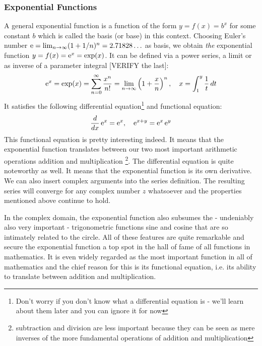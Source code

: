 \subsubsection{Exponential Functions}
A general exponential function is a function of the form $y = f(x) = b^x$ for some constant $b$ which is called the basis (or base) in this context. Choosing Euler's number $\operatorname{\mathrm{e}} = \lim_{n \rightarrow \infty} (1 + 1/n)^n = 2.71828\ldots$ as basis, we obtain \emph{the} exponential function $y = f(x) = \operatorname{\mathrm{e}}^x = \exp(x)$. It can be defined via a power series, a limit or as inverse of a parameter integral [VERIFY the last]:
\begin{equation}
\operatorname{\mathrm{e}}^x 
= \exp(x)
= \sum_{n=0}^{\infty} \frac{x^n}{n!}
= \lim_{n \rightarrow \infty} \left( 1 + \frac{x}{n} \right)^n, \quad
x = \int_1^y \frac{1}{t} \, dt
\end{equation}
It satisfies the following differential equation\footnote{Don't worry if you don't know what a differential equation is - we'll learn about them later and you can ignore it for now} and functional equation:
\begin{equation}
\frac{d}{dx} \operatorname{\mathrm{e}}^x = \operatorname{\mathrm{e}}^x, \quad
\operatorname{\mathrm{e}}^{x+y} = \operatorname{\mathrm{e}}^x \operatorname{\mathrm{e}}^y
\end{equation}
This functional equation is pretty interesting indeed. It means that the exponential function translates between our two most important arithmetic operations addition and multiplication \footnote{subtraction and division are less important because they can be seen as mere inverses of the more fundamental operations of addition and multiplication}. The differential equation is quite noteworthy as well. It means that the exponential function is its own derivative. We can also insert complex arguments into the series definition. The resulting series will converge for any complex number $z$ whatsoever and the properties mentioned above continue to hold.

\medskip
In the complex domain, the exponential function also subsumes the - undeniably also very important - trigonometric functions sine and cosine that are so intimately related to the circle. All of these features are quite remarkable and secure the exponential function a top spot in the hall of fame of all functions in mathematics. It is even widely regarded as the most important function in all of mathematics and the chief reason for this is its functional equation, i.e. its ability to translate between addition and multiplication.




